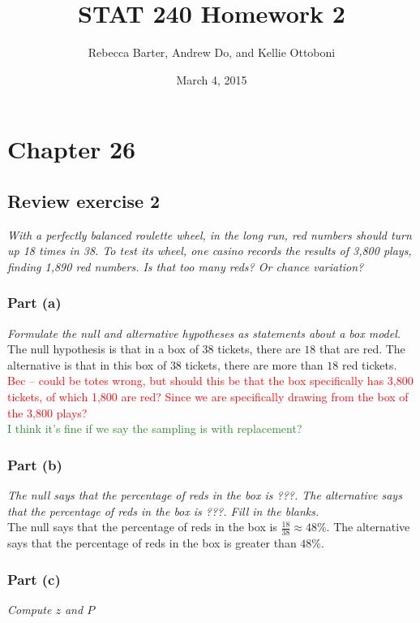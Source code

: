 \documentclass[11pt]{article}
\title{STAT 240 Homework 2}
\author{Rebecca Barter, Andrew Do, and Kellie Ottoboni}
\date{March 4, 2015} %
\begin{document}
\maketitle


\section*{Chapter 26}
\subsection*{Review exercise 2} %
\noindent \emph{With a perfectly balanced roulette wheel, in the long run, red numbers should turn up 18 times in 38. To test its wheel, one casino records the results of 3,800 plays, finding 1,890 red numbers. Is that too many reds? Or chance variation?}
\subsubsection*{Part (a)}
\noindent \emph{Formulate the null and alternative hypotheses as statements about a box model.}\\

\noindent The null hypothesis is that in a box of $38$ tickets, there are $18$ that are red.  The alternative is that in this box of $38$ tickets, there are more than $18$ red tickets.\\
\textcolor{red}{Bec -- could be totes wrong, but should this be that the box specifically has 3,800 tickets, of which 1,800 are red? Since we are specifically drawing from the box of the 3,800 plays?}\\
\textcolor{ForestGreen}{I think it's fine if we say the sampling is with replacement?}

\subsubsection*{Part (b)}
\noindent \emph{The null says that the percentage of reds in the box is ???. The alternative says that the percentage of reds in the box is ???. Fill in the blanks.}\\

\noindent The null says that the percentage of reds in the box is $\frac{18}{38}\approx 48\%$.  The alternative says that the percentage of reds in the box is greater than $48\%$.
\subsubsection*{Part (c)}
\noindent \emph{Compute $z$ and $P$}\\
\end{document}
